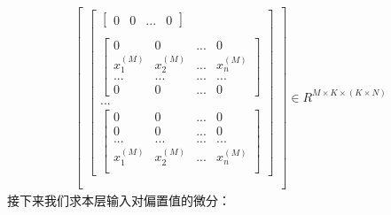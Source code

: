 \documentclass[UTF8]{article}
\begin{document}
\begin{equation}
\begin{aligned}
\begin{bmatrix}
\begin{bmatrix}
\begin{bmatrix}
 0 & 0 & ... & 0
 \end{bmatrix} \\ \\
 \begin{bmatrix}
 0 & 0 & ... & 0 \\
 x_{1}^{(M)} & x_{2}^{(M)} & ... & x_{n}^{(M)} \\
 ... & ... & ... & ... \\
 0 & 0 & ... & 0
 \end{bmatrix} \\
 ... \\
 \begin{bmatrix}
 0 & 0 & ... & 0 \\
 0 & 0 & ... & 0 \\
 ... & ... & ... & ... \\
 x_{1}^{(M)} & x_{2}^{(M)} & ... & x_{n}^{(M)} \\
 \end{bmatrix}
 \end{bmatrix} \\ \\
\end{bmatrix} \in R^{M \times K \times (K \times N)}
\end{aligned}
\label{mlp-leaky-relu-pZ-pW-def}
\end{equation}
接下来我们求本层输入对偏置值的微分：
\end{document}
